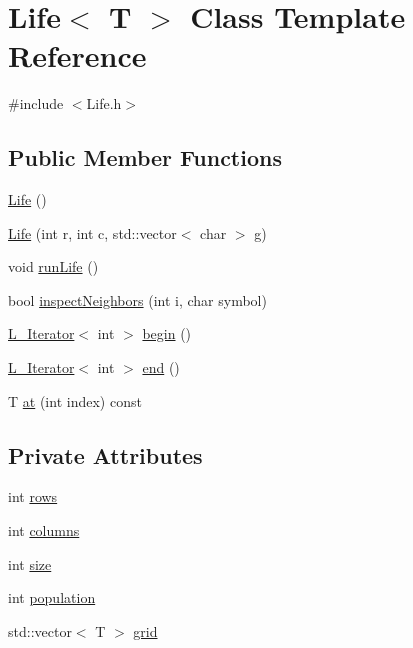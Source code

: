 \hypertarget{classLife}{\section{Life$<$ T $>$ Class Template Reference}
\label{classLife}
}


{\ttfamily \#include $<$Life.\-h$>$}

\subsection*{Public Member Functions}
\begin{DoxyCompactItemize}
\item 
\hyperlink{classLife_af49136b65408d89747b5b8157b899aa9}{Life} ()
\item 
\hyperlink{classLife_a38a1876a2663d931054ceb8ec381c951}{Life} (int r, int c, std\-::vector$<$ char $>$ g)
\item 
void \hyperlink{classLife_a7dbf17957d95e5de7eae8b2238926531}{run\-Life} ()
\item 
bool \hyperlink{classLife_a4e4342f7c4a22b0bf34f870f5ac10b44}{inspect\-Neighbors} (int i, char symbol)
\item 
\hyperlink{classL__Iterator}{L\-\_\-\-Iterator}$<$ int $>$ \hyperlink{classLife_a6054856906eebe84367ae17369bc534c}{begin} ()
\item 
\hyperlink{classL__Iterator}{L\-\_\-\-Iterator}$<$ int $>$ \hyperlink{classLife_a13070724cceb1a2d7ab73d2738386c78}{end} ()
\item 
T \hyperlink{classLife_aef6990159e25fb486ea770cc8b47a891}{at} (int index) const 
\end{DoxyCompactItemize}
\subsection*{Private Attributes}
\begin{DoxyCompactItemize}
\item 
int \hyperlink{classLife_ac8b1792a10629f1bfd890ac3acb37510}{rows}
\item 
int \hyperlink{classLife_a65d1a622f32424e9c0a10c7cc051ea58}{columns}
\item 
int \hyperlink{classLife_a53df763a5b9eae675fd8e4d3045bf1ad}{size}
\item 
int \hyperlink{classLife_ad0c82e4ef83bc0b56faf58f28e63e1e2}{population}
\item 
std\-::vector$<$ T $>$ \hyperlink{classLife_a7ecaf21e43796adda4c080cbb33b5198}{grid}
\end{DoxyCompactItemize}
